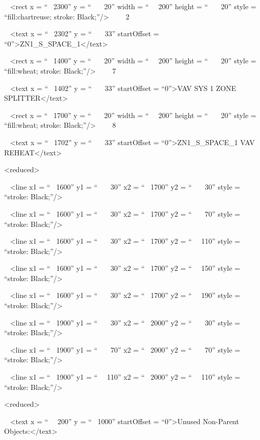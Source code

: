 ~ \textless{}rect x = ``~ 2300'' y = ``~~~ 20'' width = ``~~ 200'' height = ``~~~ 20'' style = ``fill:chartreuse; stroke: Black;''/\textgreater{}~~~~ 2

~ \textless{}text x = ``~ 2302'' y = ``~~~ 33'' startOffset = ``0''\textgreater{}ZN1\_S\_SPACE\_1\textless{}/text\textgreater{}

~ \textless{}rect x = ``~ 1400'' y = ``~~~ 20'' width = ``~~ 200'' height = ``~~~ 20'' style = ``fill:wheat; stroke: Black;''/\textgreater{}~~~~ 7

~ \textless{}text x = ``~ 1402'' y = ``~~~ 33'' startOffset = ``0''\textgreater{}VAV SYS 1 ZONE SPLITTER\textless{}/text\textgreater{}

~ \textless{}rect x = ``~ 1700'' y = ``~~~ 20'' width = ``~~ 200'' height = ``~~~ 20'' style = ``fill:wheat; stroke: Black;''/\textgreater{}~~~~ 8

~ \textless{}text x = ``~ 1702'' y = ``~~~ 33'' startOffset = ``0''\textgreater{}ZN1\_S\_SPACE\_1 VAV REHEAT\textless{}/text\textgreater{}

\textless{}reduced\textgreater{}

~ \textless{}line x1 = ``~ 1600'' y1 = ``~~~ 30'' x2 = ``~ 1700'' y2 = ``~~~ 30'' style = ``stroke: Black;''/\textgreater{}

~ \textless{}line x1 = ``~ 1600'' y1 = ``~~~ 30'' x2 = ``~ 1700'' y2 = ``~~~ 70'' style = ``stroke: Black;''/\textgreater{}

~ \textless{}line x1 = ``~ 1600'' y1 = ``~~~ 30'' x2 = ``~ 1700'' y2 = ``~~ 110'' style = ``stroke: Black;''/\textgreater{}

~ \textless{}line x1 = ``~ 1600'' y1 = ``~~~ 30'' x2 = ``~ 1700'' y2 = ``~~ 150'' style = ``stroke: Black;''/\textgreater{}

~ \textless{}line x1 = ``~ 1600'' y1 = ``~~~ 30'' x2 = ``~ 1700'' y2 = ``~~ 190'' style = ``stroke: Black;''/\textgreater{}

~ \textless{}line x1 = ``~ 1900'' y1 = ``~~~ 30'' x2 = ``~ 2000'' y2 = ``~~~ 30'' style = ``stroke: Black;''/\textgreater{}

~ \textless{}line x1 = ``~ 1900'' y1 = ``~~~ 70'' x2 = ``~ 2000'' y2 = ``~~~ 70'' style = ``stroke: Black;''/\textgreater{}

~ \textless{}line x1 = ``~ 1900'' y1 = ``~~ 110'' x2 = ``~ 2000'' y2 = ``~~ 110'' style = ``stroke: Black;''/\textgreater{}

\textless{}reduced\textgreater{}

~ \textless{}text x = ``~~ 200'' y = ``~ 1000'' startOffset = ``0''\textgreater{}Unused Non-Parent Objects:\textless{}/text\textgreater{}


